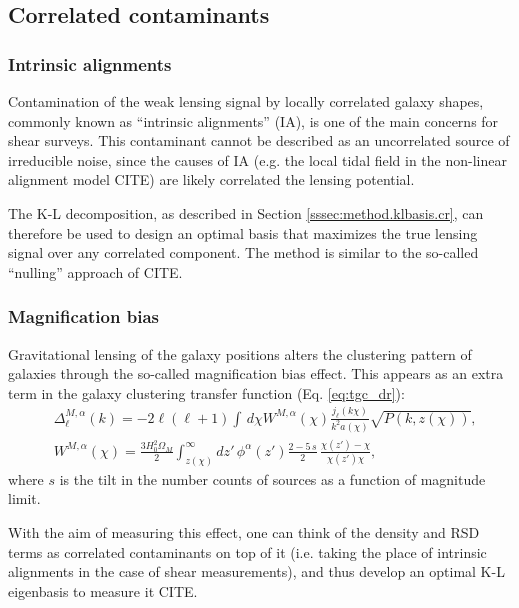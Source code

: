 \documentclass[twocolumn,amsfont,amssymb,amsmath, showpacs,balancelastpage, nofootinbib]{revtex4-1}
\begin{document}
  \subsection{Correlated contaminants} \label{ssec:results.cc}
    \subsubsection{Intrinsic alignments} \label{sssec:results.cc.ia}
      Contamination of the weak lensing signal by locally correlated galaxy shapes, commonly known as ``intrinsic alignments'' (IA), is one of the main concerns for shear surveys. This contaminant cannot be described as an uncorrelated source of irreducible noise, since the causes of IA (e.g. the local tidal field in the non-linear alignment model CITE) are likely correlated the lensing potential.
      
      The K-L decomposition, as described in Section \ref{sssec:method.klbasis.cr}, can therefore be used to design an optimal basis that maximizes the true lensing signal over any correlated component. The method is similar to the so-called ``nulling'' approach of CITE.     
      
    \subsubsection{Magnification bias} \label{sssec:results.cc.mb}
      Gravitational lensing of the galaxy positions alters the clustering pattern of galaxies through the so-called magnification bias effect. This appears as an extra term in the galaxy clustering transfer function (Eq. \ref{eq:tgc_dr}):
      \begin{align}\nonumber
        &\Delta^{M,\alpha}_\ell(k)=-2\ell(\ell+1)\int\,d\chi W^{M,\alpha}(\chi)\frac{j_\ell(k\chi)}{k^2a(\chi)}\sqrt{P(k,z(\chi))},\\
        &W^{M,\alpha}(\chi)=\frac{3H_0^2\Omega_M}{2}\int_{z(\chi)}^\infty dz'\,\phi^\alpha(z')\frac{2-5\,s}{2}\,\frac{\chi(z')-\chi}{\chi(z')\chi},
      \end{align}
      where $s$ is the tilt in the number counts of sources as a function of magnitude limit.
      
      With the aim of measuring this effect, one can think of the density and RSD terms as correlated contaminants on top of it (i.e. taking the place of intrinsic alignments in the case of shear measurements), and thus develop an optimal K-L eigenbasis to measure it CITE.

    
\end{document}
